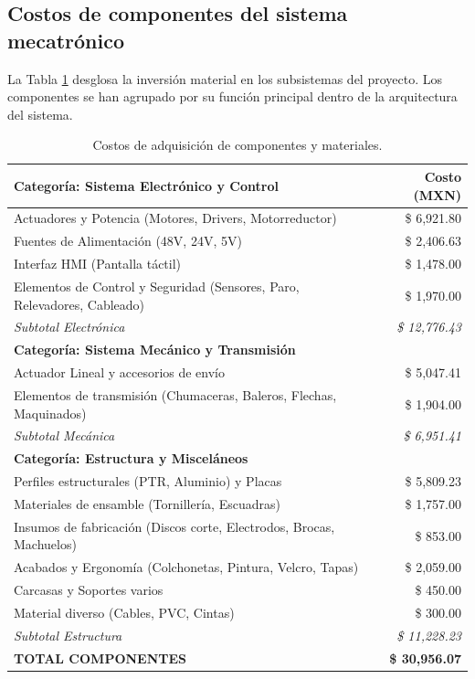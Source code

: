 \subsection{Costos de componentes del sistema mecatrónico}

La Tabla \ref{tab:costos_componentes} desglosa la inversión material en los subsistemas del proyecto. Los componentes se han agrupado por su función principal dentro de la arquitectura del sistema.

\begin{table}[h!]
	\centering
	\caption{Costos de adquisición de componentes y materiales.}
	\label{tab:costos_componentes}
	\renewcommand{\arraystretch}{1.1}
	\begin{tabular}{|p{8cm}|r|}
		\hline
		\rowcolor[HTML]{FFEBCC} 
		\textbf{Categoría: Sistema Electrónico y Control} & \textbf{Costo (MXN)} \\ \hline
		Actuadores y Potencia (Motores, Drivers, Motorreductor) & \$ 6,921.80 \\ \hline
		Fuentes de Alimentación (48V, 24V, 5V) & \$ 2,406.63 \\ \hline
		Interfaz HMI (Pantalla táctil) & \$ 1,478.00 \\ \hline
		Elementos de Control y Seguridad (Sensores, Paro, Relevadores, Cableado) & \$ 1,970.00 \\ \hline
		\textit{Subtotal Electrónica} & \textit{\$ 12,776.43} \\ \hline
		
		\rowcolor[HTML]{DEEAF6} 
		\textbf{Categoría: Sistema Mecánico y Transmisión} &  \\ \hline
		Actuador Lineal y accesorios de envío & \$ 5,047.41 \\ \hline
		Elementos de transmisión (Chumaceras, Baleros, Flechas, Maquinados) & \$ 1,904.00 \\ \hline
		\textit{Subtotal Mecánica} & \textit{\$ 6,951.41} \\ \hline
		
		\rowcolor[HTML]{E2EFDA} 
		\textbf{Categoría: Estructura y Misceláneos} &  \\ \hline
		Perfiles estructurales (PTR, Aluminio) y Placas & \$ 5,809.23 \\ \hline
		Materiales de ensamble (Tornillería, Escuadras) & \$ 1,757.00 \\ \hline
		Insumos de fabricación (Discos corte, Electrodos, Brocas, Machuelos) & \$ 853.00 \\ \hline
		Acabados y Ergonomía (Colchonetas, Pintura, Velcro, Tapas) & \$ 2,059.00 \\ \hline
		Carcasas y Soportes varios & \$ 450.00 \\ \hline
		Material diverso (Cables, PVC, Cintas) & \$ 300.00 \\ \hline
		\textit{Subtotal Estructura} & \textit{\$ 11,228.23} \\ \hline
		
		\rowcolor[HTML]{D9D9D9} 
		\textbf{TOTAL COMPONENTES} & \textbf{\$ 30,956.07} \\ \hline
	\end{tabular}
\end{table}
\clearpage
